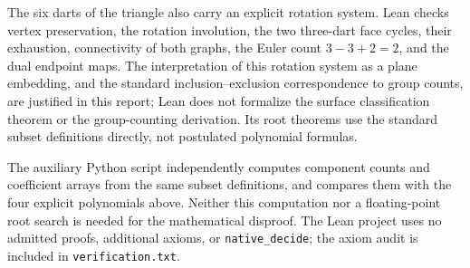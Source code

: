 \documentclass[11pt]{article}
\begin{document}
The six darts of the triangle also carry an explicit rotation system.
Lean checks vertex preservation, the rotation involution, the two
three-dart face cycles, their exhaustion, connectivity of both graphs,
the Euler count $3-3+2=2$, and the dual endpoint maps. The interpretation
of this rotation system as a plane embedding, and the standard
inclusion--exclusion correspondence to group counts, are justified in
this report; Lean does not formalize the surface classification theorem
or the group-counting derivation. Its root theorems use the standard
subset definitions directly, not postulated polynomial formulas.

The auxiliary Python script independently computes component counts
and coefficient arrays from the same subset definitions, and compares
them with the four explicit polynomials above. Neither this computation
nor a floating-point root search is needed for the mathematical disproof.
The Lean project uses no admitted proofs, additional axioms, or
\texttt{native\_decide}; the axiom audit is included in
\texttt{verification.txt}.
\end{document}
